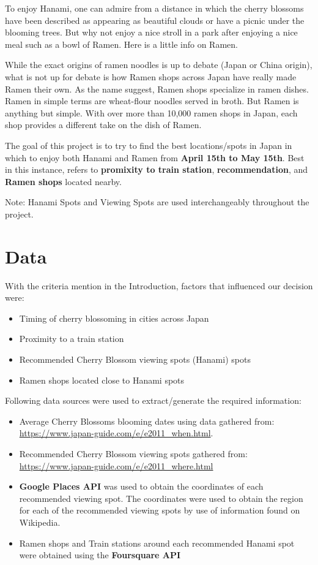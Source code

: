 \documentclass[11pt]{article}
\providecommand{\tightlist}{%
      \setlength{\itemsep}{0pt}\setlength{\parskip}{0pt}}
\begin{document}
To enjoy Hanami, one can admire from a distance in which the cherry
blossoms have been described as appearing as beautiful clouds or have a
picnic under the blooming trees. But why not enjoy a nice stroll in a park after
enjoying a nice meal such as a bowl of Ramen. Here is a little info on Ramen.

While the exact origins of ramen noodles is up to debate (Japan or China
origin), what is not up for debate is how Ramen shops across Japan have
really made Ramen their own. As the name suggest, Ramen shops specialize
in ramen dishes. Ramen in simple terms are wheat-flour noodles served in
broth. But Ramen is anything but simple. With over more than 10,000
ramen shops in Japan, each shop provides a different take on the dish of
Ramen.

The goal of this project is to try to find the best locations/spots in Japan in
which to enjoy both Hanami and Ramen from \textbf{April 15th to May
15th}. Best in this instance, refers to \textbf{promixity to train station}, 
\textbf{recommendation}, and \textbf{Ramen shops} located nearby.

Note: Hanami Spots and Viewing Spots are used interchangeably throughout
the project.

\hypertarget{data}{%
\section{Data}\label{data}}

    With the criteria mention in the Introduction, factors that influenced our decision were:
\begin{itemize}
  \tightlist
  \item Timing of cherry blossoming in cities across Japan 
  \item Proximity to a train station 
  \item Recommended Cherry Blossom viewing spots (Hanami) spots 
  \item Ramen shops located close to Hanami spots
  \end{itemize}

Following data sources were used to extract/generate the required
information: 

\begin{itemize}
  \tightlist
  \item Average Cherry Blossoms blooming dates using data gathered from: \url{https://www.japan-guide.com/e/e2011_when.html}. 
  \item Recommended Cherry Blossom viewing spots gathered from: \url{https://www.japan-guide.com/e/e2011_where.html} 
  \item \textbf{Google Places API} was used to obtain the coordinates of each recommended viewing spot. The coordinates were used 
  to obtain the region for each of the recommended viewing spots by use of information found on Wikipedia. 
  \item Ramen shops and Train stations around each recommended Hanami spot were obtained using the \textbf{Foursquare API}
\end{itemize}
\end{document}
